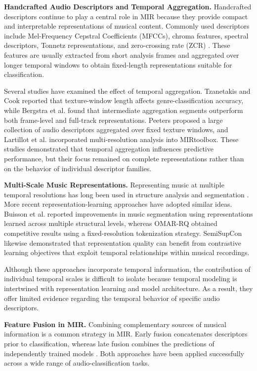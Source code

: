 \documentclass[runningheads]{llncs}
\begin{document}
\textbf{Handcrafted Audio Descriptors and Temporal Aggregation.} Handcrafted descriptors continue to play a central role in MIR because they provide compact and interpretable representations of musical content. Commonly used descriptors include Mel-Frequency Cepstral Coefficients (MFCCs), chroma features, spectral descriptors, Tonnetz representations, and zero-crossing rate (ZCR) \cite{muller2015fundamentals,lerch2012introduction}. These features are usually extracted from short analysis frames and aggregated over longer temporal windows to obtain fixed-length representations suitable for classification.

Several studies have examined the effect of temporal aggregation. Tzanetakis and Cook \cite{tzanetakis2002musical} reported that texture-window length affects genre-classification accuracy, while Bergstra et al. \cite{bergstra2006aggregate} found that intermediate aggregation segments outperform both frame-level and full-track representations. Peeters \cite{peeters2004large} proposed a large collection of audio descriptors aggregated over fixed texture windows, and Lartillot et al. \cite{lartillot2008multi} incorporated multi-resolution analysis into MIRtoolbox. These studies demonstrated that temporal aggregation influences predictive performance, but their focus remained on complete representations rather than on the behavior of individual descriptor families.

\textbf{Multi-Scale Music Representations.} Representing music at multiple temporal resolutions has long been used in structure analysis and segmentation \cite{serra2014unsupervised}. More recent representation-learning approaches have adopted similar ideas. Buisson et al. \cite{buisson2024self} reported improvements in music segmentation using representations learned across multiple structural levels, whereas OMAR-RQ \cite{alonso2025omar} obtained competitive results using a fixed-resolution tokenization strategy. SemiSupCon \cite{guinot2024semi} likewise demonstrated that representation quality can benefit from contrastive learning objectives that exploit temporal relationships within musical recordings.

Although these approaches incorporate temporal information, the contribution of individual temporal scales is difficult to isolate because temporal modeling is intertwined with representation learning and model architecture. As a result, they offer limited evidence regarding the temporal behavior of specific audio descriptors.

\textbf{Feature Fusion in MIR.} Combining complementary sources of musical information is a common strategy in MIR. Early fusion concatenates descriptors prior to classification, whereas late fusion combines the predictions of independently trained models \cite{hamel2011temporal}. Both approaches have been applied successfully across a wide range of audio-classification tasks.
\end{document}

